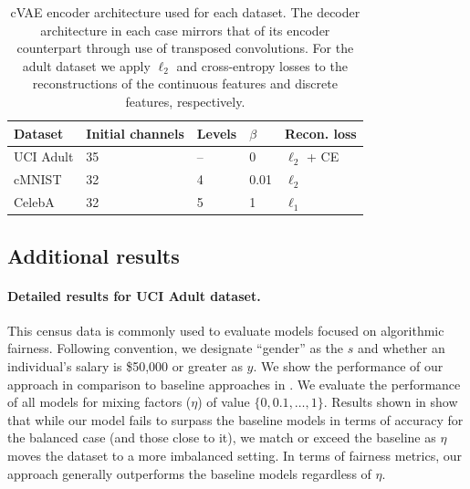 \begin{table}[tp]
\caption{
    \ac{cVAE} encoder architecture used for each dataset. The decoder architecture in each case mirrors that
of its encoder counterpart through use of transposed convolutions. For the adult dataset we apply
$\ell_2$ and cross-entropy losses to the reconstructions of the continuous features and discrete
features, respectively. }
\label{tab:vae_architectures}
\centering
\begin{tabular}{lllll}
\toprule
Dataset   & Initial channels & Levels & $\beta$ & Recon. loss \\
\midrule
UCI Adult & 35               & --     & 0       & $\ell_2$ + CE\\
cMNIST    & 32               & 4      & 0.01    & $\ell_2$ \\
CelebA    & 32               & 5      & 1       & $\ell_1$ \\ 
\bottomrule
\end{tabular}
\end{table}
%
\subsection{Additional results}\label{sec:additional-results}
%
\paragraph{Detailed results for UCI Adult dataset.}
%
This census data is commonly used to evaluate models focused on algorithmic fairness. 
%
Following convention, we designate ``gender'' as the $s$ and whether an individual's salary is
\$50,000 or greater as $y$. 
%
We show the performance of our approach in comparison to baseline approaches in
. 
%
We evaluate the performance of all models for mixing factors ($\eta$) of value \( \{0, 0.1, \dots,
1\} \). 
%
Results shown in  show that while our model fails to surpass the
baseline models in terms of accuracy for the balanced case (and those close to it), we match or
exceed the baseline as $\eta $ moves the dataset to a more imbalanced setting. 
%
In terms of fairness metrics,  our approach generally outperforms the baseline models regardless of
$\eta$.

